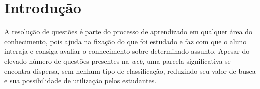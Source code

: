 %
%
% 
%

\chapter{Introdução}
\noindent

A resolução de questões é parte do processo de aprendizado em qualquer área do conhecimento, pois ajuda na fixação do que foi estudado e faz com que o aluno interaja e consiga avaliar o conhecimento sobre determinado assunto. Apesar do elevado número de questões presentes na \textit{web}, uma parcela significativa se encontra dispersa, sem nenhum tipo de classificação, reduzindo seu valor de busca e sua possibilidade de utilização pelos estudantes. 

